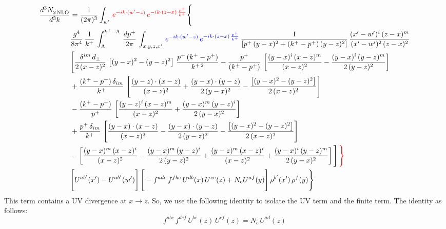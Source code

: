 \documentclass[9pt]{article}
\numberwithin{equation}{section}
\begin{document}
\begin{align}
    \frac{d^{3}N_{2\,\rm NLO}^{\rm}}{d^{3}k}  & =  \frac{1}{(2\pi)^{3}}  \int_{w^\prime}\, {\color{red}e^{-ik\cdot(w'-z)}\,e^{-ik\cdot (z-x)\,\frac{p^{+}}{k^{+}}}} \Bigg\{\notag \\ & \frac{g^{4}}{8\pi^{4}}\,\frac{1}{k^{+}}\,\int_{\Lambda}^{k^{+}-\Lambda}\, \frac{dp^{+}}{2\pi} \, \int_{x,y,z,x'}\,{\color{blue}e^{-ik\cdot(w'-z)}\,e^{-ik\cdot (z-x)\,\frac{p^{+}}{k^{+}}}}\,\frac{1}{\left[p^{+}\,(y-x)^{2}+(k^{+}-p^{+})\,(y-z)^{2}\right]}\, \frac{(x'-w')^{i}\,(z-x)^{m}}{(x'-w')^{2}\,(z-x)^{2}} \notag \\ & \Bigg[\frac{\delta^{im}\,d_{\perp}}{2\,(x-z)^{2}}\,\left[(y-x)^{2}-(y-z)^{2}\right]\,\frac{p^{+}\,(k^{+}-p^{+})}{k^{+\,2}}-\frac{p^{+}}{(k^{+}-p^{+})}\,\left[\frac{(y-x)^{i}\,(x-z)^{m}}{(x-z)^{2}}-\frac{(y-x)^{i}\,(y-z)^{m}}{2\,(y-z)^{2}}\right]\notag \\ & +\frac{(k^{+}-p^{+})\,\delta_{im}}{k^{+}}\,\left[\frac{(y-z)\cdot (x-z)}{(x-z)^{2}}+\frac{(y-x)\cdot (y-z)}{2\,(y-x)^{2}}-\frac{\left[(y-x)^{2}-(y-z)^{2}\right]}{2\,(x-z)^{2}}\right]\notag \\ & -\frac{(k^{+}-p^{+})}{p^{+}}\,\left[\frac{(y-z)^{i}\,(x-z)^{m}}{(x-z)^{2}}+\frac{(y-x)^{m}\,(y-z)^{i}}{2\,(y-x)^{2}}\right]\notag \\ & +\frac{p^{+}\,\delta_{im}}{k^{+}}\,\left[\frac{(y-x)\cdot (x-z)}{(x-z)^{2}}-\frac{(y-x)\cdot (y-z)}{2\,(y-z)^{2}}-\frac{\left[(y-x)^{2}-(y-z)^{2}\right]}{2\,(x-z)^{2}}\right]\notag \\ &-\left[\frac{(y-x)^{m}\,(x-z)^{i}}{(x-z)^{2}}-\frac{(y-x)^{m}\,(y-z)^{i}}{2\,(y-z)^{2}}+\frac{(y-z)^{m}\,(x-z)^{i}}{(x-z)^{2}}+\frac{(y-x)^{i}\,(y-z)^{m}}{2\,(y-x)^{2}}\right]\Bigg]\,{\color{red}\Bigg\}} \notag \\ & \Bigg[U^{ab'}(x')-U^{ab'}(w')\Bigg]\,\Bigg[-f^{adc}\,f^{fbe}\,U^{db}(x)\,U^{ce}(z)+N_{c}U^{af}(y)\Bigg]\,\rho^{b'}(x')\,\rho^{f}(y)\Bigg\}
\end{align}
This term contains a UV divergence at $x\rightarrow z$.  So, we use the following identity to isolate the UV term and the finite term. The identity as follows:
$$f^{abc}\,f^{def}\,U^{be}(z)\,U^{cf}(z) = N_{c}\,U^{ad}(z)$$
\end{document}
